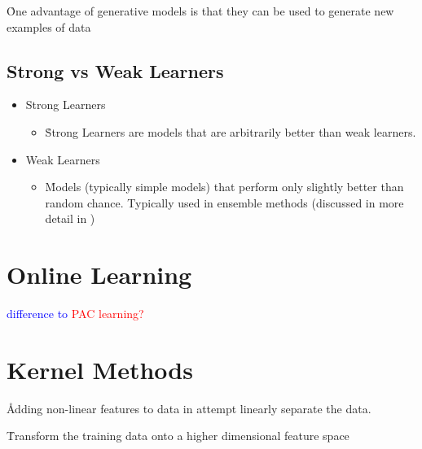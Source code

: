 \r{One advantage of generative models is that they can be used to generate new examples of data}

\subsection{Strong vs Weak Learners}


\begin{itemize}[noitemsep,topsep=0pt]
	\item Strong Learners
	\begin{itemize}[noitemsep,topsep=0pt]
		\item \r{Strong Learners are models that are arbitrarily better than weak learners.}
	\end{itemize}
	\item Weak Learners
	\begin{itemize}[noitemsep,topsep=0pt]
		\item \r{Models (typically simple models) that perform only slightly better than random chance. Typically used in ensemble methods (discussed in more detail in \ALR)}
	\end{itemize}
\end{itemize}

\section{Online Learning}

\textcolor{blue}{difference to \textcolor{red}{PAC learning?}}


\section{Kernel Methods}
\label{sec:kernel_trick}

\r{Adding non-linear features to data in attempt linearly separate the data.}


\r{Transform the training data onto a higher dimensional feature space}

